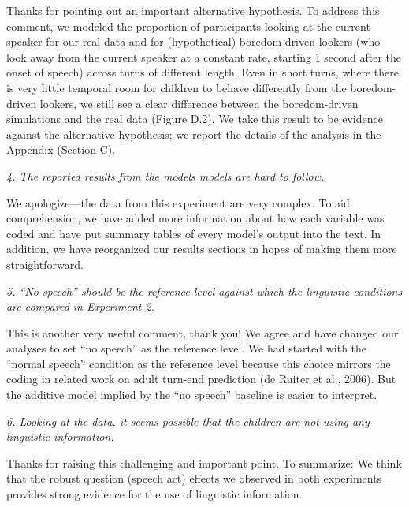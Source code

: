 \documentclass[11pt,a4paper]{letter} %
\begin{document}
\begin{letter}{}
\noindent Thanks for pointing out an important alternative hypothesis. To address this comment, we modeled the proportion of participants looking at the current speaker for our real data and for (hypothetical) boredom-driven lookers (who look away from the current speaker at a constant rate, starting 1 second after the onset of speech) across turns of different length. Even in short turns, where there is very little temporal room for children to behave differently from the boredom-driven lookers, we still see a clear difference between the boredom-driven simulations and the real data (Figure D.2). We take this result to be evidence against the alternative hypothesis; we report the details of the analysis in the Appendix (Section C).

\smallskip

\noindent \textit{4. The reported results from the models models are hard to follow.}

\noindent We apologize---the data from this experiment are very complex. To aid comprehension, we have added more information about how each variable was coded and have put summary tables of every model's output into the text. In addition, we have reorganized our results sections in hopes of making them more straightforward. 

\smallskip

\noindent \textit{5. ``No speech'' should be the reference level against which the linguistic conditions are compared in Experiment 2.}

\noindent This is another very useful comment, thank you! We agree and have changed our analyses to set ``no speech'' as the reference level. We had started with the ``normal speech'' condition as the reference level because this choice mirrors the coding in related work on adult turn-end prediction (de Ruiter et al., 2006). But the additive model implied by the ``no speech'' baseline is easier to interpret. 

\noindent \textit{6. Looking at the data, it seems possible that the children are not using any linguistic information.}

\noindent Thanks for raising this challenging and important point. To summarize: We think that the robust question (speech act) effects we observed in both experiments provides strong evidence for the use of linguistic information.


\end{letter}
\end{document}
